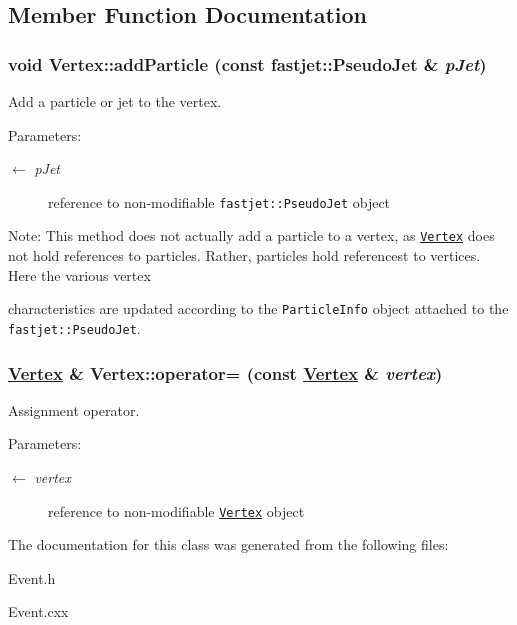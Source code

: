 \subsection{Member Function Documentation}
\hypertarget{classVertex_074af7ae6f1948dbe9704516ed7575f4}{
\subsubsection[addParticle]{\setlength{\rightskip}{0pt plus 5cm}void Vertex::add\-Particle (const fastjet::Pseudo\-Jet \& {\em p\-Jet})}}
\label{classVertex_074af7ae6f1948dbe9704516ed7575f4}


Add a particle or jet to the vertex. 

\begin{Desc}
\item[Parameters:]
\begin{description}
\item[\mbox{$\leftarrow$} {\em p\-Jet}]reference to non-modifiable {\tt fastjet::Pseudo\-Jet} object\end{description}
\end{Desc}
\begin{Desc}
\item[Note:]This method does not actually add a particle to a vertex, as {\tt \hyperlink{classVertex}{Vertex}} does not hold references to particles. Rather, particles hold referencest to vertices. Here the various vertex\end{Desc}
characteristics are updated according to the {\tt Particle\-Info} object attached to the {\tt fastjet::Pseudo\-Jet}. \hypertarget{classVertex_d02d78d2a640cdc2f7ef1eb95f36ef79}{
\subsubsection[operator=]{\setlength{\rightskip}{0pt plus 5cm}\hyperlink{classVertex}{Vertex} \& Vertex::operator= (const \hyperlink{classVertex}{Vertex} \& {\em vertex})}}
\label{classVertex_d02d78d2a640cdc2f7ef1eb95f36ef79}


Assignment operator. 

\begin{Desc}
\item[Parameters:]
\begin{description}
\item[\mbox{$\leftarrow$} {\em vertex}]reference to non-modifiable {\tt \hyperlink{classVertex}{Vertex}} object \end{description}
\end{Desc}


The documentation for this class was generated from the following files:\begin{CompactItemize}
\item 
Event.h\item 
Event.cxx\end{CompactItemize}

